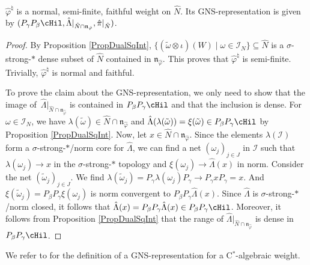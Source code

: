 \begin{prop}\label{PropNSFWeightVNA}
 $\hat{\varphi}^\natural$  is a normal, semi-finite, faithful weight on $\hat{N}$. Its GNS-representation is given by $(P_\gamma P_\beta \cHil, \hat{\Lambda} \vert_{\hat{N} \cap \mathfrak{n}_{\hat{\varphi}}}, \hat{\pi}\vert_{\hat{N}})$.
\end{prop}
\begin{proof}
By Proposition \ref{PropDualSqInt}, $\{ (\tilde{\omega} \otimes \iota)(W) \mid \omega \in \mathcal{I}_N \} \subseteq \hat{N}$ is a $\sigma$-strong-$\ast$ dense subset of $\hat{N}$ contained in $\mathfrak{n}_{\hat{\varphi}}$. This proves that $\hat{\varphi}^\natural$ is semi-f\/inite. Trivially,  $\hat{\varphi}^\natural$ is normal and faithful.

 To prove the claim about the GNS-representation, we only need to show that the image of~$\hat{\Lambda} \vert_{\hat{N} \cap \mathfrak{n}_{\hat{\varphi}}}$ is contained in   $P_\beta P_\gamma \cHil$ and that the inclusion is dense.
For $\omega \in \mathcal{I}_N$, we have $\lambda(\tilde{\omega}) \in \hat{N} \cap \mathfrak{n}_{\hat{\varphi}}$ and $\hat{\Lambda}(\lambda(\tilde{\omega})) = \xi(\tilde{\omega}) \in P_\beta P_\gamma \cHil$ by Proposition \ref{PropDualSqInt}.  Now, let $x \in \hat{N} \cap \mathfrak{n}_{\hat{\varphi}}$. Since the elements $\lambda(\mathcal{I})$ form a $\sigma$-strong-$\ast$/norm core for $\hat{\Lambda}$, we can f\/ind a net $(\omega_j)_{j \in J}$ in $\mathcal{I}$ such that $\lambda(\omega_j) \rightarrow x$ in the $\sigma$-strong-$\ast$ topology and $\xi(\omega_j) \rightarrow \hat{\Lambda}(x)$ in norm.  Consider the net $(\tilde{\omega}_j)_{j \in J}$. We f\/ind $\lambda(\tilde{\omega}_j)  = P_\gamma \lambda(\omega_j) P_\gamma \rightarrow P_\gamma x P_\gamma = x$. And $\xi(\tilde{\omega}_j) = P_\beta P_\gamma \xi(\omega_j)$ is norm convergent to $ P_\beta P_\gamma \hat{\Lambda}(x)$. Since $\hat{\Lambda}$ is $\sigma$-strong-$\ast$/norm closed, it follows that $\hat{\Lambda}(x) =   P_\beta P_\gamma \hat{\Lambda}(x) \in P_\beta P_\gamma \cHil$. Moreover, it follows from Proposition \ref{PropDualSqInt} that the range of  $\hat{\Lambda} \vert_{\hat{N} \cap \mathfrak{n}_{\hat{\varphi}}}$ is dense in $P_\beta P_\gamma \cHil$.
\end{proof}

We refer to \cite[Section 1.1]{KusVae} for the def\/inition of a GNS-representation for a C$^\ast$-algebraic weight.



